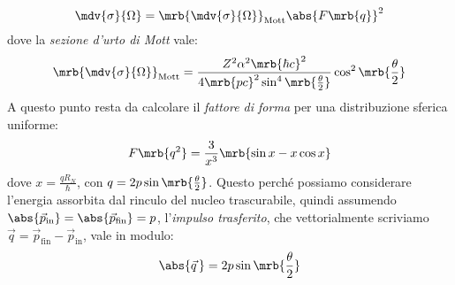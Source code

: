 \begin{example}
  \begin{equation}
    \mdv{\sigma}{\Omega} = \mrb{\mdv{\sigma}{\Omega}}_\text{Mott} \abs{F
    \mrb{q}}^{2}
  \end{equation}
  dove la \textit{sezione d'urto di Mott} vale:
  \begin{equation}
    \mrb{\mdv{\sigma}{\Omega}}_\text{Mott} = \frac{Z^2 \alpha^2 \mrb{\hbar
    c}^{2}}{4 \mrb{pc}^{2} \sin^4 \mrb{\frac{\theta}{2}}} \cos ^{2}
    \mrb{\frac{\theta}{2}}
  \end{equation}
  A questo punto resta da calcolare il \textit{fattore di forma} per una
  distribuzione sferica uniforme:
  \begin{equation}
    F \mrb{q^2} = \frac{3}{x^3} \mrb{\sin x - x \cos x} %
  \end{equation}
  dove $x = \frac{q R_N}{\hbar}$, con $q = 2 p \sin \mrb{\frac{\theta}{2}}$.
  Questo perché possiamo considerare l'energia assorbita dal rinculo del nucleo
  trascurabile, quindi assumendo $\abs{\vec{p}_\text{in}} =
  \abs{\vec{p}_\text{fin}} = p$, l'\textit{impulso trasferito}, che
  vettorialmente scriviamo $\vec{q} = \vec{p}_\text{fin} - \vec{p}_\text{in}$,
  vale in modulo:
  \begin{equation}
    \abs{\vec{q}\,} = 2 p \sin \mrb{\frac{\theta}{2}}
  \end{equation}
\end{example}
